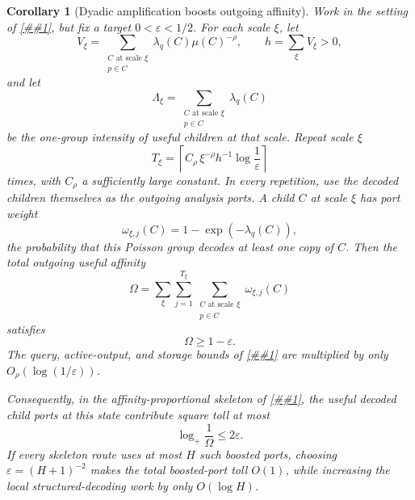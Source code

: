 \documentclass[10pt]{article}
\newcommand{\cref}[1]{\ref{##1}}
\newtheorem{corollary}[theorem]{Corollary}
\theoremstyle{definition}
\begin{document}
\begin{corollary}[Dyadic amplification boosts outgoing affinity]
   \label{cor:dyadic-affinity-boost}
   Work in the setting of \cref{lem:dyadic-structured-amplification}, but fix
   a target \(0<\varepsilon<1/2\).  For each scale \(\xi\), let
   \[
      V_\xi
      =
      \sum_{\substack{C\text{ at scale }\xi\\p\in C}}
      \lambda_q(C)\mu(C)^{-\rho},
      \qquad
      h=\sum_\xi V_\xi>0,
      \tag{DAB0}
   \]
   and let
   \[
      \Lambda_\xi
      =
      \sum_{\substack{C\text{ at scale }\xi\\p\in C}}\lambda_q(C)
      \tag{DAB1}
   \]
   be the one-group intensity of useful children at that scale.  Repeat scale
   \(\xi\)
   \[
      T_\xi
      =
      \left\lceil
         C_\rho\,\xi^{-\rho}h^{-1}\log\frac1\varepsilon
      \right\rceil
      \tag{DAB2}
   \]
   times, with \(C_\rho\) a sufficiently large constant.  In every repetition,
   use the decoded children themselves as the outgoing analysis ports.  A child
   \(C\) at scale \(\xi\) has port weight
   \[
      \omega_{\xi,j}(C)=1-\exp(-\lambda_q(C)),
      \tag{DAB3}
   \]
   the probability that this Poisson group decodes at least one copy of \(C\).
   Then the total outgoing useful affinity
   \[
      \Omega=
      \sum_\xi\sum_{j=1}^{T_\xi}
      \sum_{\substack{C\text{ at scale }\xi\\p\in C}}
      \omega_{\xi,j}(C)
      \tag{DAB4}
   \]
   satisfies
   \[
      \Omega\ge1-\varepsilon .
      \tag{DAB5}
   \]
   The query, active-output, and storage bounds of
   \cref{lem:dyadic-structured-amplification} are multiplied by only
   \(O_\rho(\log(1/\varepsilon))\).

   Consequently, in the affinity-proportional skeleton of
   \cref{cor:affinity-proportional-route-law}, the useful decoded child ports
   at this state contribute square toll at most
   \[
      \log_+\frac1\Omega
      \le 2\varepsilon .
      \tag{DAB6}
   \]
   If every skeleton route uses at most \(H\) such boosted ports, choosing
   \(\varepsilon=(H+1)^{-2}\) makes the total boosted-port toll \(O(1)\), while
   increasing the local structured-decoding work by only \(O(\log H)\).
\end{corollary}
\end{document}
